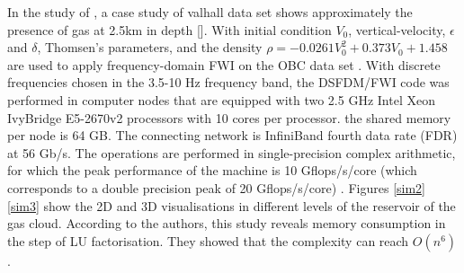 In the study of \cite{Operto2015}, a case study of valhall data set shows approximately the presence of gas at 2.5km in depth []. With initial condition $V_0$, vertical-velocity, $\epsilon$ and $\delta$,  Thomsen's parameters, and the density $\rho = -0.0261 V^{2}_{0} + 0.373 V_0 + 1.458$ are used to apply frequency-domain FWI on the OBC data set \cite{Operto2015, Amestoy2016}. With discrete frequencies chosen in the 3.5-10 Hz frequency band, the DSFDM/FWI code was performed in computer nodes that are equipped with two 2.5 GHz Intel Xeon IvyBridge E5-2670v2 processors with 10 cores per processor. the shared memory per node is 64 GB. The connecting network is InfiniBand fourth data rate (FDR) at 56 Gb/s. The operations are performed in single-precision complex arithmetic, for which the peak performance of the machine is 10 Gflops/s/core (which corresponds to a double precision peak of 20 Gflops/s/core) \cite{Operto2015}. Figures \ref{sim2} \ref{sim3} show the 2D and 3D visualisations in different levels of the reservoir of the gas cloud.
According to the authors, this study reveals memory consumption in the step of LU factorisation. They showed that the complexity can reach $O (n^{6}) $ \cite{Operto2015}.
%


